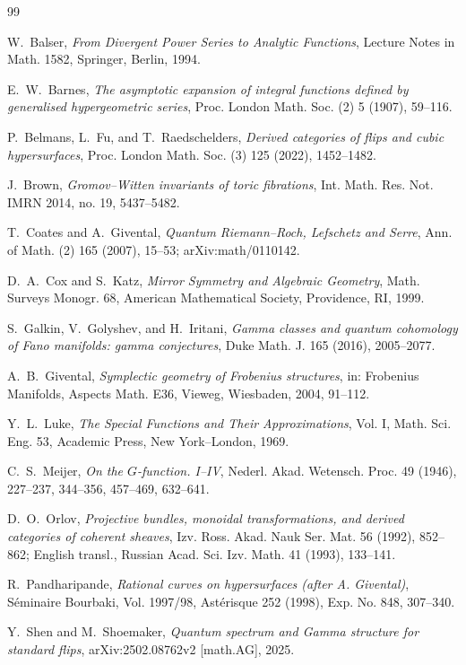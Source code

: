 \documentclass[11pt]{article}
\theoremstyle{definition}
\theoremstyle{remark}
\begin{document}
\begin{thebibliography}{99}

W.~Balser,
\emph{From Divergent Power Series to Analytic Functions},
Lecture Notes in Math. 1582, Springer, Berlin, 1994.

E.~W.~Barnes,
\emph{The asymptotic expansion of integral functions defined by generalised
hypergeometric series},
Proc. London Math. Soc. (2) 5 (1907), 59--116.

P.~Belmans, L.~Fu, and T.~Raedschelders,
\emph{Derived categories of flips and cubic hypersurfaces},
Proc. London Math. Soc. (3) 125 (2022), 1452--1482.

J.~Brown,
\emph{Gromov--Witten invariants of toric fibrations},
Int. Math. Res. Not. IMRN 2014, no. 19, 5437--5482.

T.~Coates and A.~Givental,
\emph{Quantum Riemann--Roch, Lefschetz and Serre},
Ann. of Math. (2) 165 (2007), 15--53; arXiv:math/0110142.

D.~A.~Cox and S.~Katz,
\emph{Mirror Symmetry and Algebraic Geometry},
Math. Surveys Monogr. 68, American Mathematical Society, Providence, RI, 1999.

S.~Galkin, V.~Golyshev, and H.~Iritani,
\emph{Gamma classes and quantum cohomology of Fano manifolds: gamma
conjectures},
Duke Math. J. 165 (2016), 2005--2077.

A.~B.~Givental,
\emph{Symplectic geometry of Frobenius structures},
in: Frobenius Manifolds, Aspects Math. E36, Vieweg, Wiesbaden, 2004,
91--112.

Y.~L.~Luke,
\emph{The Special Functions and Their Approximations}, Vol. I,
Math. Sci. Eng. 53, Academic Press, New York--London, 1969.

C.~S.~Meijer,
\emph{On the \(G\)-function. I--IV},
Nederl. Akad. Wetensch. Proc. 49 (1946), 227--237, 344--356, 457--469,
632--641.

D.~O.~Orlov,
\emph{Projective bundles, monoidal transformations, and derived categories of
coherent sheaves},
Izv. Ross. Akad. Nauk Ser. Mat. 56 (1992), 852--862;
English transl., Russian Acad. Sci. Izv. Math. 41 (1993), 133--141.

R.~Pandharipande,
\emph{Rational curves on hypersurfaces (after A. Givental)},
S\'eminaire Bourbaki, Vol. 1997/98, Ast\'erisque 252 (1998), Exp. No. 848,
307--340.

Y.~Shen and M.~Shoemaker,
\emph{Quantum spectrum and Gamma structure for standard flips},
arXiv:2502.08762v2 [math.AG], 2025.

\end{thebibliography}
\end{document}
